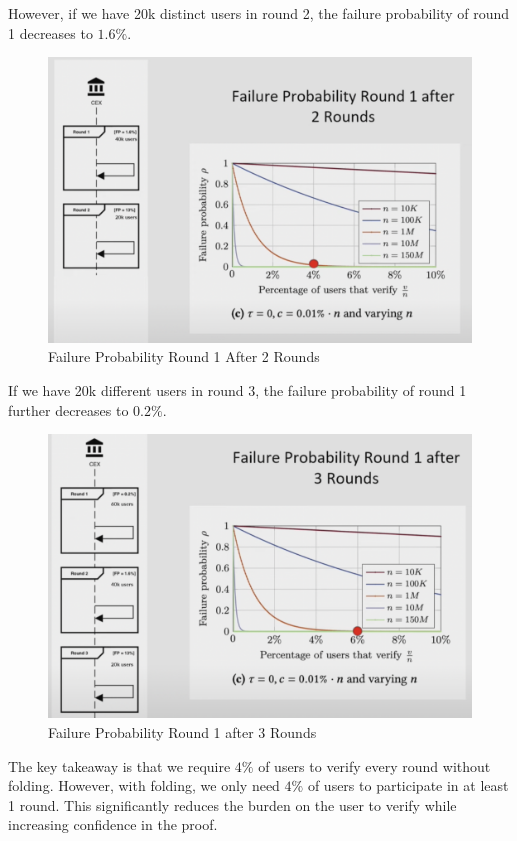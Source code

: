 However, if we have 20k distinct users in round 2, the failure probability of round 1 decreases to $1.6\%$.

\begin{figure}[H]
   \centering
   \includegraphics[width=130mm]{FailureProbabilityRound2.png}
   \caption{Failure Probability Round 1 After 2 Rounds \cite{NS23}}
   \label{overflow}
   \end{figure}

If we have 20k different users in round 3, the failure probability of round 1 further decreases to $0.2\%$.

\begin{figure}[H]
   \centering
   \includegraphics[width=130mm]{FailureProbabilityRound3.png}
   \caption{Failure Probability Round 1 after 3 Rounds \cite{NS23}}
   \label{overflow}
   \end{figure}
The key takeaway is that we require $4\%$ of users to verify every round without folding. However, with folding, we only need
$4\%$ of users to participate in at least 1 round. This significantly reduces the burden on the user to verify while increasing confidence in the proof.

